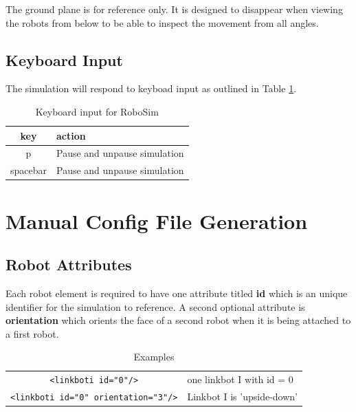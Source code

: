 \documentclass{article}
\begin{document}
The ground plane is for reference only.  It is designed to disappear when
viewing the robots from below to be able to inspect the movement from all
angles.

\subsection{Keyboard Input}
The simulation will respond to keyboad input as outlined in Table
\ref{tab:keys}.

\begin{table}[H]
	\begin{center}
	\begin{tabular}{c | l }
		\hline \hline
		\textbf{key} & \textbf{action} \\ \hline
		p & Pause and unpause simulation \\
		spacebar & Pause and unpause simulation \\
		\hline \hline
	\end{tabular}
	\caption{Keyboard input for RoboSim}
	\label{tab:keys}
	\end{center}
\end{table}

\appendix
\section{Manual Config File Generation}
\subsection{Robot Attributes}
Each robot element is required to have one attribute titled \textbf{id} which is
an unique identifier for the simulation to reference.  A second optional
attribute is \textbf{orientation} which orients the face of a second robot when
it is being attached to a first robot.

\begin{table}[H]
	\begin{center}
	\begin{tabular}{c | l}
		\hline 
		\verb|<linkboti id="0"/>| & one linkbot I with id = 0 \\
		\verb|<linkboti id="0" orientation="3"/>| & Linkbot I is 'upside-down' \\
		\hline
	\end{tabular}
	\caption{Examples}
	\label{tab:ex}
	\end{center}
\end{table}
\end{document}
